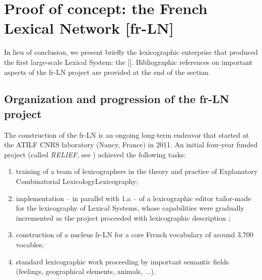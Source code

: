 \section{Proof of concept: the French Lexical Network [fr-LN]}\label{sec:fr-LN}

In lieu of conclusion, we present briefly the lexicographic enterprise that produced the first large-scale Lexical System: the  \mbox{[]}. Bibliographic references on important aspects of the fr-LN project are provided at the end of the section.

\subsection{Organization and progression of the fr-LN project}

The construction of the fr-LN is an ongoing long-term endeavor that started at the ATILF CNRS laboratory (Nancy, France) in 2011. An initial four-year funded project (called \textit{RELIEF}, see \cite{LuxPogodallaPolguere2011}) achieved the following tasks:

\begin{enumerate}

\item[1.a)] training of a team of lexicographers in the theory and practice of Explanatory Combinatorial Lexicology\slashs{}Lexicography;

\item[1.b)] implementation -- in parallel with 1.a -- of a lexicographic editor tailor-made for the lexicography of Lexical Systems, whose capabilities were gradually incremented as the project proceeded with lexicographic description \parencite{GaderEtAl2012};

\item[2)] construction of a nucleus fr-LN for a core French vocabulary of around 3,700 vocables;

\item[3)] standard lexicographic work proceeding by important semantic fields (feelings, geographical elements, animals, ...).

\end{enumerate}

